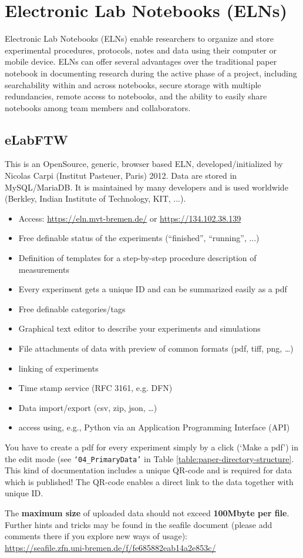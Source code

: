 \section[Electronic Lab Notebooks]{Electronic Lab Notebooks (ELNs)}\label{ssc:ELN}

Electronic Lab Notebooks (ELNs) enable researchers to organize and store
experimental procedures, protocols, notes and data using their computer or
mobile device. ELNs can offer several advantages over the traditional paper
notebook in documenting research during the active phase of a project, including
searchability within and across notebooks, secure storage with multiple
redundancies, remote access to notebooks, and the ability to easily share
notebooks among team members and collaborators.

\subsection{eLabFTW}

This is an OpenSource, generic, browser based ELN, developed/initialized by
Nicolas Carpi (Institut Pasteuer, Paris) 2012. Data are stored in MySQL/MariaDB.
It is maintained by many developers and is used worldwide (Berkley, Indian
Institute of Technology, KIT, ...).
\begin{itemize}
  \item Access: \url{https://eln.mvt-bremen.de/} or \url{https://134.102.38.139}
  \item Free definable status of the experiments (“finished”, “running”, ...)
  \item Definition of templates for a step-by-step procedure description of
        measurements
  \item Every experiment gets a unique ID and can be summarized easily as a pdf
  \item Free definable categories/tags
  \item Graphical text editor to describe your experiments and simulations
  \item File attachments of data with preview of common formats (pdf, tiff, png, …)
  \item linking of experiments
  \item Time stamp service (RFC 3161, e.g. DFN)
  \item Data import/export (csv, zip, json, …)
  \item access using, e.g., Python via an Application Programming Interface (API)
\end{itemize}

You have to create a pdf for every experiment simply by a click (‘Make a pdf’)
in the edit mode (see \texttt{‘04\_PrimaryData’} in Table
\ref{table:paper-directory-structure}. This kind of documentation includes a
unique QR-code and is required for data which is published! The QR-code enables
a direct link to the data together with unique ID.

The \textbf{maximum size} of uploaded data should not exceed
\textbf{100Mbyte per file}. Further hints and tricks may be found in the seafile
document (please add comments there if you explore new ways of usage): \\
\url{https://seafile.zfn.uni-bremen.de/f/fe685882eab14a2e853c/}
